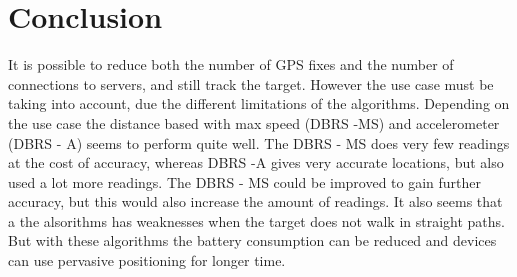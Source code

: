 \section{Conclusion}
It is possible to reduce both the number of GPS fixes and the number of connections to servers, and still track the target. However the use case must be taking into account, due the different limitations of the algorithms. Depending on the use case the distance based with max speed (DBRS -MS) and accelerometer (DBRS - A) seems to perform quite well. The DBRS - MS does very few readings at the cost of accuracy, whereas DBRS -A gives very accurate locations, but also used a lot more readings. The DBRS - MS could be improved to gain further accuracy, but this would also increase the amount of readings. It also seems that a the alsorithms has weaknesses when the target does not walk in straight paths. But with these algorithms the battery consumption can be reduced and devices can use pervasive positioning for longer time.